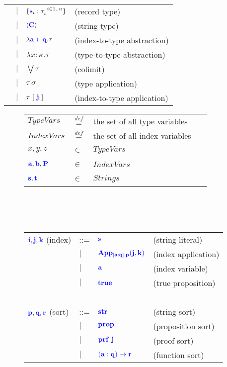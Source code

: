 \documentclass[sigplan,10pt,review,anonymous]{acmart}
\newcommand{\blu}[1]{\textbf{\color{blue}{#1}}}
\newcommand{\blum}[1]{\mathbf{\color{blue}{#1}}}
\newcommand{\defeq}{\overset{\mathit{def}}{=}}
\begin{document}
\begin{tabular}{llll}
       & $\mid$ & $\{ \blu{s}_i : \tau_i^{~i \in 1..n} \}$ & (record type) \\
       & $\mid$ & $\langle \blu{C} \rangle$ & (string type) \\
       & $\mid$ & $\lambda \blu{a : q} . \tau$ & (index-to-type abstraction) \\
       & $\mid$ & $\lambda x : \kappa. \tau$ & (type-to-type abstraction) \\
       & $\mid$ & $\bigvee \tau$ & (colimit) \\
       & $\mid$ & $\tau~\sigma$ & (type application) \\
       & $\mid$ & $\tau~[~\blu{j}~]$ & (index-to-type application)
\end{tabular}

\fi 

\begin{figure}
\begin{tabular}{llll}
$\mathit{TypeVars}$ & $\defeq$ & the set of all type variables \\
$\mathit{IndexVars}$ & $\defeq$ & the set of all index variables \\
$x,y,z$ & $\in$ & $\mathit{TypeVars}$ & ~ \\
$\blu{a}, \blu{b}, \blu{P}$ & $\in$ & $\mathit{IndexVars}$ & ~ \\
$\blu{s},\blu{t}$ & $\in$ & $\mathit{Strings}$ & ~ \\
\end{tabular}\\~\\~\\
\begin{tabular}{llll}
$\blu{i},\blu{j},\blu{k}$ (index) & ::=  & $\blum{s}$ & (string literal) \\
                          & $\mid$ & $\blum{App}_{\blum{[a : q],p}}\blum{(j,k)}$ & (index application) \\
                          & $\mid$ & $\blu{a}$ & (index variable) \\
                          & $\mid$ & $\blu{true}$ & (true proposition) \\
~ & ~ & ~ & ~ \\
$\blu{p},\blu{q},\blu{r}$ (sort) & ::= & $\blum{str}$ & (string sort) \\
                         & $\mid$ & $\blum{prop}$ & (proposition sort) \\
                         & $\mid$ & $\blum{prf~j}$ & (proof sort) \\
                         & $\mid$ & $\blum{(a : q) \to r}$ & (function sort) \\

\end{tabular}
\end{figure}
\end{document}
